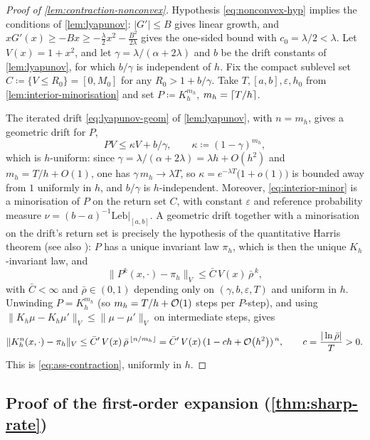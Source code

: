 \documentclass[aap,preprint]{imsart}
\DeclarePairedDelimiter{\ppair}{(}{)} %
\DeclarePairedDelimiter{\floor}{\lfloor}{\rfloor} %
\DeclarePairedDelimiter{\ceil}{\lceil}{\rceil} %
\newcommand\pp[2][0pt]{\ppair*{#2}} %
\newcommand\order[1]{\mathcal{O}\pp{#1}}
\numberwithin{equation}{section}
\theoremstyle{plain}
\theoremstyle{definition}
\begin{document}
\begin{proof}[Proof of \cref{lem:contraction-nonconvex}]
  Hypothesis \eqref{eq:nonconvex-hyp} implies the conditions of \cref{lem:lyapunov}: $|G'|\le B$
  gives linear growth, and $xG'(x)\ge-Bx\ge-\tfrac\lambda2 x^2-\tfrac{B^2}{2\lambda}$ gives the
  one-sided bound with $c_0=\lambda/2<\lambda$. Let $V(x)=1+x^2$, and let
  $\gamma=\lambda/(\alpha+2\lambda)$ and $b$ be the drift constants of \cref{lem:lyapunov}, for which
  $b/\gamma$ is independent of $h$. Fix the compact sublevel set $C\coloneqq\{V\le R_0\}=[0,M_0]$ for any
  $R_0>1+b/\gamma$.
  Take $T,[a,b],\varepsilon,h_0$ from \cref{lem:interior-minorisation} and set $P\coloneqq
  K_h^{m_h}$, $m_h=\ceil*{T/h}$. 
  
  The iterated drift \eqref{eq:lyapunov-geom} of
  \cref{lem:lyapunov}, with $n=m_h$, gives a geometric drift for $P$,
  \[
    PV\le\kappa V+b/\gamma,\qquad \kappa\coloneqq(1-\gamma)^{m_h},
  \]
  which is $h$-uniform: since $\gamma=\lambda/(\alpha+2\lambda)=\lambda h+O(h^2)$ and $m_h=T/h+O(1)$,
  one has $\gamma\,m_h\to\lambda T$, so $\kappa=e^{-\lambda T}\bigl(1+o(1)\bigr)$ is bounded away from
  $1$ uniformly in $h$, and $b/\gamma$ is $h$-independent. Moreover, \eqref{eq:interior-minor} is a
  minorisation of $P$ on the return set $C$, with constant $\varepsilon$ and reference probability
  measure $\nu=(b-a)^{-1}\mathrm{Leb}|_{[a,b]}$. A geometric drift together with a minorisation on
  the drift's return set is precisely the hypothesis of the quantitative Harris theorem
  \citep[Thm.~1.3]{HairerMattingly2011} (see also \citealp[Thm.~15.0.1]{MeynTweedie1993}): $P$ has
  a unique invariant law $\pi_h$, which is then the unique $K_h$-invariant law, and
  \[
    \|P^k(x,\cdot)-\pi_h\|_V\le \bar C\,V(x)\,\bar\rho^{\,k},
  \]
  with $\bar C<\infty$ and $\bar\rho\in(0,1)$ depending only on $(\gamma,b,\varepsilon,T)$ and uniform in $h$. Unwinding $P=K_h^{m_h}$ (so $m_h=T/h+\order{1}$ steps per $P$-step), and
  using $\|K_h\mu-K_h\mu'\|_V\le \|\mu-\mu'\|_V$ on intermediate steps, gives
  \[
    \|K_h^n(x,\cdot)-\pi_h\|_V\le \bar C'\,V(x)\,\bar\rho^{\,\floor*{n/m_h}}
      =\bar C'\,V(x)\,(1-ch+\order{h^2})^{\,n},\qquad c=\frac{|\ln\bar\rho|}{T}>0 .
  \]
  This is \eqref{eq:ass-contraction}, uniformly in $h$.
\end{proof}

\subsection{Proof of the first-order expansion (\cref{thm:sharp-rate})}\label{app:sharp-rate}
\end{document}
